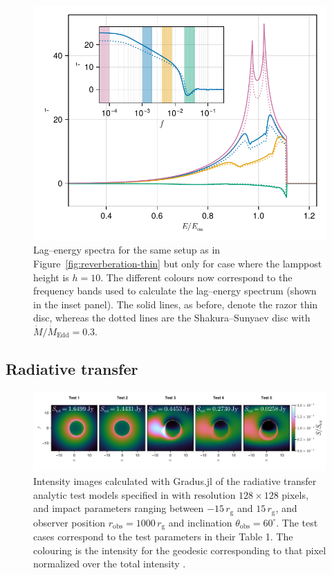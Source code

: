 \documentclass[fleqn,usenatbib]{mnras}
\newcommand{\software}[1]{{\sc #1}}
\newcommand{\Gradus}{\software{Gradus.jl}\xspace}
\newcommand{\rg}{r_\text{g}}
\begin{document}
\begin{figure}
    \centering
    \includegraphics[width=0.98\columnwidth]{figures/reverberation.lag-energy.pdf}
    \caption{Lag--energy spectra for the same setup as in
        Figure~\ref{fig:reverberation-thin} but only for case where the lamppost
        height is $h=10$. The different colours now correspond to the frequency
        bands used to calculate the lag--energy spectrum (shown in the inset
        panel). The solid lines, as before, denote the razor thin disc, whereas
    the dotted lines are the Shakura--Sunyaev disc with $\dot{M} /
\dot{M}_\text{Edd} =0.3$.}
    \label{fig:lag-energy}
\end{figure}


\subsection{Radiative transfer}

\begin{figure}
    \centering
    \includegraphics[width=0.99\linewidth]{figures/radiative-transfer.gold.pdf}
    \caption{Intensity images calculated with \Gradus of the radiative transfer
    analytic test models specified in \citet{gold_verification_2020} with
    resolution $128 \times 128$ pixels, and impact parameters ranging between $-15\,
    \rg$ and $15\, \rg$, and observer position $r_\text{obs} = 1000\, \rg$ and
    inclination $\theta_\text{obs} = 60^\circ$. The test cases correspond to the
    test parameters in their Table 1. The colouring is the intensity for the
    geodesic corresponding to that pixel normalized over the total intensity .}
    \label{fig:gold-test-problems}
\end{figure}
\end{document}
